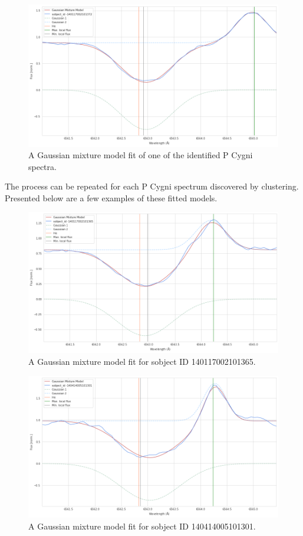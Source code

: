 \begin{figure}[!htb]
\centering
\includegraphics[scale=0.45]{figures/p cugni fitted.png}
\caption{A Gaussian mixture model fit of one of the identified P Cygni spectra.}
\end{figure}

The process can be repeated for each P Cygni spectrum discovered by clustering. Presented below are a few examples of these fitted models. 

\begin{figure}[!htb]
\centering
\includegraphics[scale=0.45]{figures/p cygni fitted 2.png}
\caption{A Gaussian mixture model fit for sobject ID 140117002101365. }
\end{figure}

\begin{figure}[!htb]
\centering
\includegraphics[scale=0.45]{figures/p cygni fitted 3.png}
\caption{A Gaussian mixture model fit for sobject ID 140414005101301. }
\end{figure}

